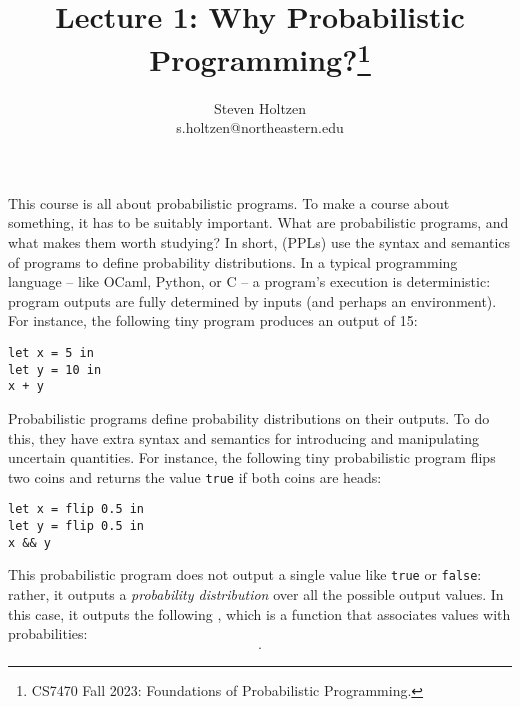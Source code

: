 \documentclass{../tufte-handout}
\title{Lecture 1: Why Probabilistic Programming?\thanks{CS7470 Fall 2023: Foundations of Probabilistic Programming.}}
\author[]{Steven Holtzen\\s.holtzen@northeastern.edu}
\begin{document}
\maketitle%

This course is all about probabilistic programs. To make a course about
something, it has to be suitably important. What are probabilistic programs, and
what makes them worth studying?  In short,  (PPLs) use the syntax and semantics of programs to define probability
distributions.
In a typical programming language -- like OCaml, Python, or C -- 
a program's execution is deterministic: program outputs are fully determined by inputs 
(and perhaps an environment). For instance, the following tiny program 
produces an output of 15:

\begin{lstlisting}
let x = 5 in
let y = 10 in
x + y
\end{lstlisting}

Probabilistic programs define probability distributions on their outputs. 
To do this, they have extra syntax and semantics for introducing and manipulating 
uncertain quantities. For instance, the following tiny probabilistic program flips 
two coins and returns the value \texttt{true} if both coins are heads:

\begin{lstlisting}
let x = flip 0.5 in
let y = flip 0.5 in
x && y
\end{lstlisting}

This probabilistic program does not output a single value like \texttt{true} or
\texttt{false}: rather, it outputs a \emph{probability distribution} over all
the possible output values. In this case, it outputs the following , which is a function that associates values with probabilities:
\begin{align*}
  [\texttt{true} \mapsto 0.25, \qquad \texttt{false} \mapsto 0.75].
\end{align*}
\end{document}
